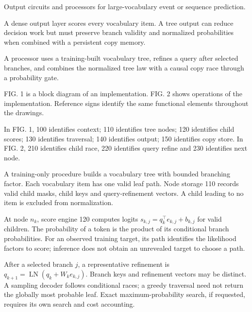 \documentclass[pct]{sm-patent}
\begin{document}
\descriptionstart


\pnum Output circuits and processors for large-vocabulary event or sequence prediction.


\pnum A dense output layer scores every vocabulary item. A tree output can reduce decision work but must preserve branch validity and normalized probabilities when combined with a persistent copy memory.


\pnum A processor uses a training-built vocabulary tree, refines a query after selected branches, and combines the normalized tree law with a causal copy race through a probability gate.


\pnum FIG. 1 is a block diagram of an implementation. FIG. 2 shows operations of the implementation. Reference signs identify the same functional elements throughout the drawings.


\pnum In FIG. 1, 100 identifies context; 110 identifies tree nodes; 120 identifies child scores; 130 identifies traversal; 140 identifies output; 150 identifies copy store. In FIG. 2, 210 identifies child race, 220 identifies query refine and 230 identifies next node.

\pnum A training-only procedure builds a vocabulary tree with bounded branching factor. Each vocabulary item has one valid leaf path. Node storage 110 records valid child masks, child keys and query-refinement vectors. A child leading to no item is excluded from normalization.

\pnum At node $n_k$, score engine 120 computes logits $s_{k,j}=q_k^\top e_{k,j}+b_{k,j}$ for valid children. The probability of a token is the product of its conditional branch probabilities. For an observed training target, its path identifies the likelihood factors to score; inference does not obtain an unrevealed target to choose a path.

\pnum After a selected branch $j$, a representative refinement is $q_{k+1}=\operatorname{LN}(q_k+W_ke_{k,j})$. Branch keys and refinement vectors may be distinct. A sampling decoder follows conditional races; a greedy traversal need not return the globally most probable leaf. Exact maximum-probability search, if requested, requires its own search and cost accounting.
\end{document}
